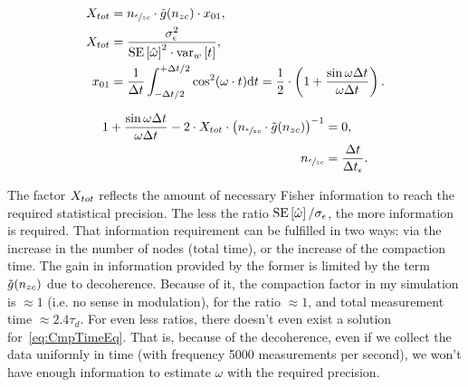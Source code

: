 \documentclass{article}
\newcommand{\dt}{\Delta t}
\begin{document}
%

\begin{align*}
	X_{tot}	&= \Nmnd\cdot \tilde{g}(\Nnd)\cdot x_{01}, \\
	X_{tot}	&= \stat, \\
	x_{01}	&= \frac{1}{\dt}\int_{-\dt/2}^{+\dt/2}\cos^2(\omega\cdot t)\td t = \frac12\cdot \bkt{1 + \frac{\sin\omega\dt}{\omega\dt}}.
\end{align*}

\begin{align}\label{eq:CmpTimeEq}
	1 + \frac{\sin\omega\dt}{\omega\dt} - 2\cdot \stat* \cdot \bkt{\Nmnd\cdot \tilde{g}(\Nnd)}^{-1} &=0, \\
	\Nmnd	&= \frac{\dt}{\dt_{\meas}}. \notag
\end{align}

The factor $\stat*$ reflects the amount of necessary Fisher information to reach the required statistical precision. The less the ratio $\SE{\hat{\omega}}/\SD{\meas}$, the more information is required. That information requirement can be fulfilled in two ways: via the increase in the number of nodes (total time), or the increase of the compaction time. The gain in information provided by the former is limited by the term $\tilde{g}(n_{zc})$ due to decoherence. Because of it, the compaction factor in my simulation is $\approx 1$ (i.e. no sense in modulation), for the ratio $\approx 1$, and total measurement time $\approx 2.4\tau_d$. For even less ratios, there doesn't even exist a solution for~\eqref{eq:CmpTimeEq}. That is, because of the decoherence, even if we collect the data uniformly in time (with frequency 5000 measurements per second), we won't have enough information to estimate $\omega$ with the required precision.
\end{document}
